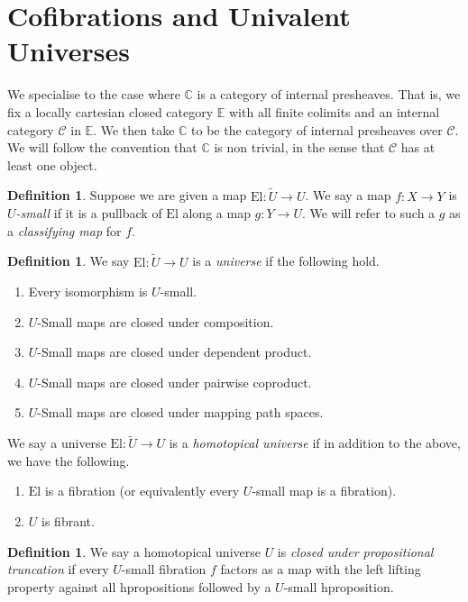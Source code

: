 \documentclass[a4paper]{amsart}
\theoremstyle{definition}
\newtheorem{definition}[theorem]{Definition}
\newcommand{\cat}[1]{\mathbb{#1}}
\newcommand{\catc}{\cat{C}}
\newcommand{\smcat}[1]{\mathcal{#1}}
\newcommand{\elu}{\mathrm{El}}
\begin{document}
\section{Cofibrations and Univalent Universes}
\label{sec:cofibr-univ}

We specialise to the case where $\catc$ is a category of internal
presheaves. That is, we fix a locally cartesian closed category
$\cat{E}$ with all finite colimits and an
internal category $\smcat{C}$ in $\cat{E}$. We then take $\catc$ to be
the category of internal presheaves over $\smcat{C}$. We will follow
the convention that $\catc$ is non trivial, in the sense that
$\smcat{C}$ has at least one object.

\begin{definition}
  Suppose we are given a map $\elu \colon \tilde{U} \to U$. We say a
  map $f \colon X \to Y$ is \emph{$U$-small} if it is a pullback of
  $\elu$ along a map $g \colon Y \to U$. We will refer to such a $g$
  as a \emph{classifying map} for $f$.
\end{definition}

\begin{definition}
  We say $\elu \colon \tilde{U} \to U$ is a \emph{universe} if the
  following hold.
  \begin{enumerate}
  \item Every isomorphism is $U$-small.
  \item $U$-Small maps are closed under composition.
  \item $U$-Small maps are closed under dependent product.
  \item $U$-Small maps are closed under pairwise coproduct.
  \item $U$-Small maps are closed under mapping path spaces.
  \end{enumerate}

  We say a universe $\elu \colon \tilde{U} \to U$ is a
  \emph{homotopical universe} if in addition to the above, we have the
  following.
  \begin{enumerate}
  \item $\elu$ is a fibration (or equivalently every $U$-small map is
    a fibration).
  \item $U$ is fibrant.
  \end{enumerate}
\end{definition}

\begin{definition}
  \label{def:smallproptrunc}
  We say a homotopical universe $U$ is \emph{closed under propositional
    truncation} if every $U$-small fibration $f$ factors as a map with
  the left lifting property against all hpropositions followed by a
  $U$-small hproposition.
\end{definition}
\end{document}
